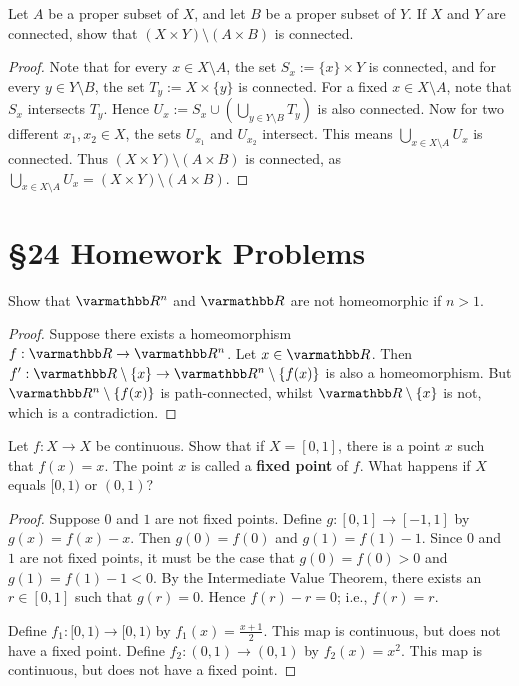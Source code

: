 \documentclass[10pt,oneside,openany]{memoir}
\begin{document}
\begin{exercise}[manual-num={9}]
Let $A$ be a proper subset of $X$, and let $B$ be a proper subset of $Y$. If $X$ and $Y$ are connected, show that $(X \times Y) \setminus (A \times B)$ is connected.
\end{exercise}
    \begin{proof}
        Note that for every $x \in X \setminus A$, the set $S_{x} := \{x\} \times Y$ is connected, and for every $y \in Y \setminus B$, the set $T_{y} := X \times \{y\}$ is connected. For a fixed $x \in X \setminus A$, note that $S_x$ intersects $T_y$. Hence $U_x:= S_x \cup \left( \bigcup_{y \in Y \setminus B} T_y\right)$ is also connected. Now for two different $x_1,x_2 \in X$, the sets $U_{x_1}$ and $U_{x_2}$ intersect. This means $\bigcup_{x \in X \setminus A}U_x$ is connected. Thus $(X \times Y) \setminus (A \times B)$ is connected, as $\bigcup_{x \in X \setminus A}U_x = (X \times Y) \setminus (A \times B)$.
    \end{proof}
\newpage
\section*{\S 24 Homework Problems}
\begin{exercise}[manual-num={1(c)}]
Show that $\bfR^n$ and $\bfR$ are not homeomorphic if $n > 1$.
\end{exercise}
    \begin{proof}
        Suppose there exists a homeomorphism $f:\bfR \rightarrow \bfR^n$. Let $x \in \bfR$. Then $f':\bfR\setminus\{x\} \rightarrow \bfR^n \setminus \{f(x)\}$ is also a homeomorphism. But $\bfR^n \setminus\{f(x)\}$ is path-connected, whilst $\bfR \setminus\{x\}$ is not, which is a contradiction.
    \end{proof}

\begin{exercise}[manual-num={3}]
Let $f:X \rightarrow X$ be continuous. Show that if $X = [0,1]$, there is a point $x$ such that $f(x) = x$. The point $x$ is called a \textbf{fixed point} of $f$. What happens if $X$ equals $[0,1)$ or $(0,1)$?
\end{exercise}
    \begin{proof}
        Suppose $0$ and $1$ are not fixed points. Define $g:[0,1] \rightarrow [-1,1]$ by $g(x) = f(x) - x$. Then $g(0) = f(0)$ and $g(1) = f(1) - 1$. Since $0$ and $1$ are not fixed points, it must be the case that $g(0) = f(0) > 0$ and $g(1) = f(1) - 1 < 0$. By the Intermediate Value Theorem, there exists an $r \in [0,1]$ such that $g(r) = 0$. Hence $f(r) - r = 0$; i.e., $f(r) = r$.

        Define $f_1:[0,1) \rightarrow [0,1)$ by $f_1(x) = \frac{x+1}{2}$. This map is continuous, but does not have a fixed point. Define $f_2:(0,1) \rightarrow (0,1)$ by $f_2(x) = x^2$. This map is continuous, but does not have a fixed point.
    \end{proof}
\end{document}

